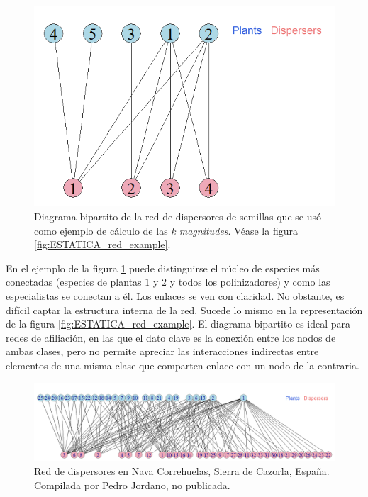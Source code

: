 \begin{figure}[h!]
\centering
\includegraphics[scale=0.43]{Figures/VIS_SD_030_bipartita.png}
\caption{Diagrama bipartito de la red de dispersores de semillas que se usó como ejemplo de cálculo de las \textit{k magnitudes}. Véase la figura \ref{fig:ESTATICA_red_example}.}
\label{fig:Figures/VIS_SD_030_bipartita}
\end{figure}

En el ejemplo de la figura \ref{fig:Figures/VIS_SD_030_bipartita} puede distinguirse el núcleo de especies más conectadas (especies de plantas $1$ y $2$ y todos los polinizadores) y como las especialistas se conectan a él. Los enlaces se ven con claridad. No obstante, es difícil captar la estructura interna de la red. Sucede lo mismo en la representación de la figura \ref{fig:ESTATICA_red_example}. El diagrama bipartito es ideal para redes de afiliación, en las que el dato clave es la conexión entre los nodos de ambas clases, pero no permite apreciar las interacciones indirectas entre elementos de una misma clase que comparten enlace con un nodo de la contraria.

\begin{figure}[h!]
\centering
\includegraphics[scale=0.4]{Figures/VIS_bipartito_SD_020.png}
\caption{Red de dispersores en Nava Correhuelas, Sierra de Cazorla, España. Compilada por Pedro Jordano, no publicada.}
\label{fig:VIS_bipartito_SD_020}
\end{figure}

